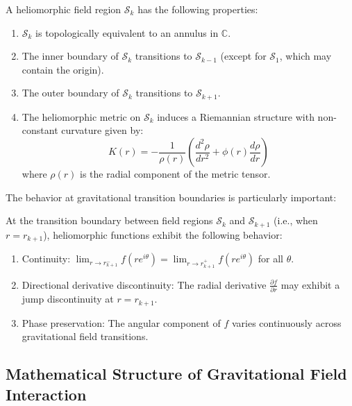 \begin{definition}
\begin{theorem}
\begin{proposition}
A heliomorphic field region $\mathcal{S}_k$ has the following properties:
\begin{enumerate}
    \item $\mathcal{S}_k$ is topologically equivalent to an annulus in $\mathbb{C}$.
    \item The inner boundary of $\mathcal{S}_k$ transitions to $\mathcal{S}_{k-1}$ (except for $\mathcal{S}_1$, which may contain the origin).
    \item The outer boundary of $\mathcal{S}_k$ transitions to $\mathcal{S}_{k+1}$.
    \item The heliomorphic metric on $\mathcal{S}_k$ induces a Riemannian structure with non-constant curvature given by:
    \begin{equation}
    K(r) = -\frac{1}{\rho(r)}\left(\frac{d^2\rho}{dr^2} + \phi(r)\frac{d\rho}{dr}\right)
    \end{equation}
    where $\rho(r)$ is the radial component of the metric tensor.
\end{enumerate}
\end{proposition}

The behavior at gravitational transition boundaries is particularly important:

\begin{theorem}
At the transition boundary between field regions $\mathcal{S}_k$ and $\mathcal{S}_{k+1}$ (i.e., when $r = r_{k+1}$), heliomorphic functions exhibit the following behavior:
\begin{enumerate}
    \item Continuity: $\lim_{r \to r_{k+1}^-} f(re^{i\theta}) = \lim_{r \to r_{k+1}^+} f(re^{i\theta})$ for all $\theta$.
    \item Directional derivative discontinuity: The radial derivative $\frac{\partial f}{\partial r}$ may exhibit a jump discontinuity at $r = r_{k+1}$.
    \item Phase preservation: The angular component of $f$ varies continuously across gravitational field transitions.
\end{enumerate}
\end{theorem}

\subsection{Mathematical Structure of Gravitational Field Interaction}


\end{theorem}
\end{definition}
